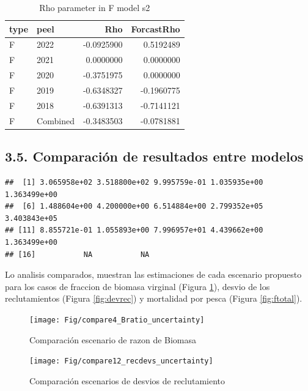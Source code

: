 \documentclass[
]{article}
\begin{document}
\begin{table}[H]
\centering
\caption{\label{tab:unnamed-chunk-16}Rho parameter in F model s2}
\centering
\begin{tabular}[t]{llrr}
\toprule
type & peel & Rho & ForcastRho\\
\midrule
F & 2022 & -0.0925900 & 0.5192489\\
F & 2021 & 0.0000000 & 0.0000000\\
F & 2020 & -0.3751975 & 0.0000000\\
F & 2019 & -0.6348327 & -0.1960775\\
F & 2018 & -0.6391313 & -0.7141121\\
\addlinespace
F & Combined & -0.3483503 & -0.0781881\\
\bottomrule
\end{tabular}
\end{table}

\pagebreak

\hypertarget{comparaciuxf3n-de-resultados-entre-modelos}{%
\subsection{3.5. Comparación de resultados entre modelos}\label{comparaciuxf3n-de-resultados-entre-modelos}}

\begin{verbatim}
##  [1] 3.065958e+02 3.518800e+02 9.995759e-01 1.035935e+00 1.363499e+00
##  [6] 1.488604e+00 4.200000e+00 6.514884e+00 2.799352e+05 3.403843e+05
## [11] 8.855721e-01 1.055893e+00 7.996957e+01 4.439662e+00 1.363499e+00
## [16]           NA           NA
\end{verbatim}

Lo analisis comparados, muestran las estimaciones de cada escenario propuesto para los casos de fraccion de biomasa virginal (Figura \ref{fig:biov}), desvio de los reclutamientos (Figura \ref{fig:devrec}) y mortalidad por pesca (Figura \ref{fig:ftotal}).

\begin{figure}[H]

{\centering \texttt{[image: Fig/compare4\_Bratio\_uncertainty]} 

}

\caption{\label{fig:biov}Comparación escenario de razon de Biomasa}\label{fig:biov}
\end{figure}

\begin{figure}[H]

{\centering \texttt{[image: Fig/compare12\_recdevs\_uncertainty]} 

}

\caption{\label{fig:devrec}Comparación escenarios de desvios de reclutamiento}\label{fig:debrec}
\end{figure}
\end{document}
